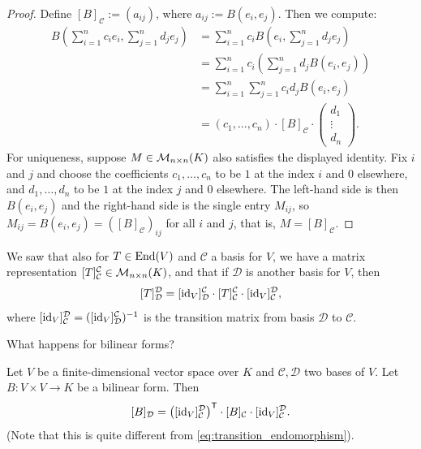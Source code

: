 \begin{proof}
Define $[B]_{\mathcal{C}} := (a_{ij})$, where $a_{ij} := B(e_i, e_j)$. Then we compute:
\begin{align*}
B\left(\sum_{i=1}^n c_i e_i, \sum_{j=1}^n d_j e_j\right) &= \sum_{i=1}^n c_i B\left(e_i, \sum_{j=1}^n d_j e_j\right) \\
&= \sum_{i=1}^n c_i \left(\sum_{j=1}^n d_j B(e_i, e_j)\right) \\
&= \sum_{i=1}^n \sum_{j=1}^n c_i d_j B(e_i, e_j) \\
&= (c_1, \dots, c_n) \cdot [B]_{\mathcal{C}} \cdot \begin{pmatrix} d_1 \\ \vdots \\ d_n \end{pmatrix}.
\end{align*}
For uniqueness, suppose $M \in \mathcal{M}_{n \times n}(K)$ also satisfies the displayed identity. Fix $i$ and $j$ and choose the coefficients $c_1, \dots, c_n$ to be $1$ at the index $i$ and $0$ elsewhere, and $d_1, \dots, d_n$ to be $1$ at the index $j$ and $0$ elsewhere. The left-hand side is then $B(e_i, e_j)$ and the right-hand side is the single entry $M_{ij}$, so $M_{ij} = B(e_i, e_j) = ([B]_{\mathcal{C}})_{ij}$ for all $i$ and $j$, that is, $M = [B]_{\mathcal{C}}$.
\end{proof}

We saw that also for $T \in \operatorname{End}(V)$ and $\mathcal{C}$ a basis for $V$, we have a matrix representation $[T]_{\mathcal{C}}^{\mathcal{C}} \in \mathcal{M}_{n \times n}(K)$, and that if $\mathcal{D}$ is another basis for $V$, then
\begin{equation}
\label{eq:transition_endomorphism}
[T]_{\mathcal{D}}^{\mathcal{D}} = [\operatorname{id}_V]_{\mathcal{D}}^{\mathcal{C}} \cdot [T]_{\mathcal{C}}^{\mathcal{C}} \cdot [\operatorname{id}_V]_{\mathcal{C}}^{\mathcal{D}},
\end{equation}
where $[\operatorname{id}_V]_{\mathcal{C}}^{\mathcal{D}} = ([\operatorname{id}_V]_{\mathcal{D}}^{\mathcal{C}})^{-1}$ is the transition matrix from basis $\mathcal{D}$ to $\mathcal{C}$.

\begin{question}
What happens for bilinear forms?
\end{question}

\begin{lemma}
\label{lem:change_of_basis_bilinear}
Let $V$ be a finite-dimensional vector space over $K$ and $\mathcal{C}, \mathcal{D}$ two bases of $V$. Let $B \colon V \times V \to K$ be a bilinear form. Then
\[
[B]_{\mathcal{D}} = \left([\operatorname{id}_V]_{\mathcal{C}}^{\mathcal{D}}\right)^{\mathsf{T}} \cdot [B]_{\mathcal{C}} \cdot [\operatorname{id}_V]_{\mathcal{C}}^{\mathcal{D}}.
\]
(Note that this is quite different from \eqref{eq:transition_endomorphism}).
\end{lemma}

